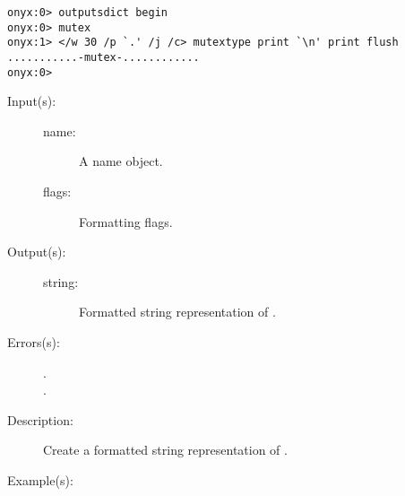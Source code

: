 \begin{description}
\begin{description}
\begin{verbatim}
onyx:0> outputsdict begin
onyx:0> mutex
onyx:1> </w 30 /p `.' /j /c> mutextype print `\n' print flush
...........-mutex-............
onyx:0>
		\end{verbatim}
	\end{description}
\label{outputsdict:nametype}
\item[{\onyxop{name flags}{nametype}{string}}: ]
	\begin{description}\item[]
	\item[Input(s): ]
		\begin{description}\item[]
		\item[name: ]
			A name object.
		\item[flags: ]
			Formatting flags.
		\end{description}
	\item[Output(s): ]
		\begin{description}\item[]
		\item[string: ]
			Formatted string representation of .
		\end{description}
	\item[Errors(s): ]
		\begin{description}\item[]
		\item[.]
		\item[.]
		\end{description}
	\item[Description: ]
		Create a formatted string representation of .
	\item[Example(s): ]\begin{verbatim}


\end{verbatim}
\end{description}
\end{description}
